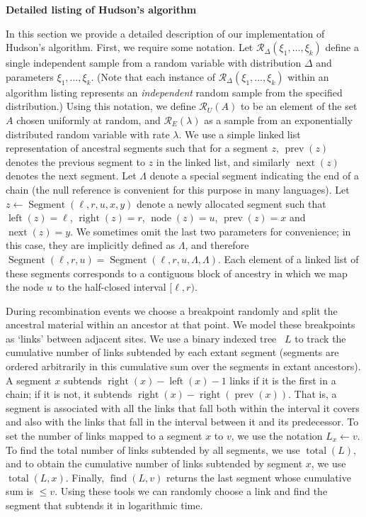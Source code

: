 \documentclass[10pt,letterpaper]{article}
\newcommand{\randomuniform}[0]{\mathcal{R}_U}
\newcommand{\randomexponential}[0]{\mathcal{R}_E}
\DeclareMathOperator{\segright}{right}
\DeclareMathOperator{\segleft}{left}
\DeclareMathOperator{\segnode}{node}
\DeclareMathOperator{\segnext}{next}
\DeclareMathOperator{\segprev}{prev}
\DeclareMathOperator{\segment}{Segment}
\DeclareMathOperator{\bittotal}{total}
\DeclareMathOperator{\bitfind}{find}
\begin{document}
\textbf{Detailed listing of Hudson's algorithm}

In this section we provide a detailed description of our implementation of
Hudson's algorithm. First, we require some notation. Let
$\mathcal{R}_\Delta(\xi_1, \dots, \xi_k)$ define a single independent sample
from a random variable with distribution $\Delta$ and parameters $\xi_1,\dots,
\xi_k$. (Note that each instance of $\mathcal{R}_\Delta(\xi_1, \dots, \xi_k)$
within an algorithm listing represents an \emph{independent} random sample from
the specified distribution.) Using this notation, we define $\randomuniform(A)$
to be an element of the set $A$ chosen uniformly at random, and
$\randomexponential(\lambda)$ as a sample from an exponentially distributed
random variable with rate $\lambda$. We use a simple linked list representation
of ancestral segments such that for a segment $z$, $\segprev(z)$ denotes the
previous segment to $z$ in the linked list, and similarly $\segnext(z)$ denotes
the next segment. Let $\Lambda$ denote a special segment indicating the end of
a chain (the null reference is convenient for this purpose in many languages).
Let $z \leftarrow \segment(\ell, r, u, x, y)$ denote a newly allocated segment
such that $\segleft(z) = \ell$, $\segright(z) = r$, $\segnode(z) = u$,
$\segprev(z) = x$ and  $\segnext(z) = y$. We sometimes omit the last two parameters
for convenience; in this case, they are implicitly defined as $\Lambda$, and
therefore $\segment(\ell, r, u) = \segment(\ell, r, u, \Lambda, \Lambda)$. Each
element of a linked list of these segments corresponds to a contiguous block of
ancestry in which we map the node $u$ to the half-closed interval $[\ell, r)$.

During recombination events we choose a breakpoint randomly and split the
ancestral material within an ancestor at that point. We model these breakpoints
as `links' between adjacent sites. We use a binary indexed tree~\citep{f94,f95}
$L$ to track the cumulative number of links subtended by each extant segment
(segments are ordered arbitrarily in this cumulative sum over the segments
in extant ancestors). A segment $x$
subtends $\segright(x) - \segleft(x) - 1$ links if it is the first in a chain;
if it is not, it subtends $\segright(x) - \segright(\segprev(x))$. That is,
a segment is associated with all the links that fall both within the interval
it covers and also with the links that fall in the interval between it and
its predecessor. To set the number of links mapped to a
segment $x$ to $v$, we use the notation $L_x \leftarrow v$. To find the total
number of links subtended by all segments, we use $\bittotal(L)$, and to obtain
the cumulative number of links subtended by segment $x$, we use $\bittotal(L,
x)$.  Finally, $\bitfind(L, v)$ returns the last segment whose cumulative sum
is $\leq v$. Using these tools we can randomly choose a link and find
the segment that subtends it in logarithmic time.
\end{document}
